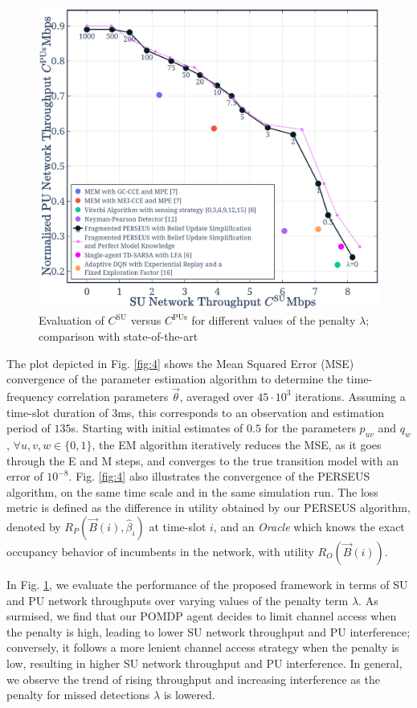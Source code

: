 \documentclass[10pt,twocolumn]{IEEEtran}
\begin{document}
\begin{figure}[t]
    \centering
    \includegraphics[width=0.8\linewidth]{Evaluation_2.png}
    \caption{Evaluation of $C^{\text{SU}}$ versus $C^{\text{PUs}}$ for different values of the penalty $\lambda$; comparison with state-of-the-art}
    \label{fig:8}
    \vspace{-6mm}
\end{figure}

The plot depicted in Fig. \ref{fig:4} shows the Mean Squared Error (MSE) convergence of the parameter estimation algorithm to determine the time-frequency correlation parameters $\vec{\theta}$, averaged over $45{\cdot} 10^3$ iterations. Assuming a time-slot duration of $3$ms, this corresponds to an observation and estimation period of $135$s. Starting with initial estimates of $0.5$ for the parameters $p_{uv}$ and $q_{w}$, ${\forall}u,v,w{\in}\{0,1\}$, the EM algorithm iteratively reduces the MSE, as it goes through the E and M steps, and converges to the true transition model with an error of $10^{-8}$. Fig. \ref{fig:4} also illustrates the convergence of the PERSEUS algorithm, on the same time scale and in the same simulation run. The loss metric is defined as the difference in utility obtained by our PERSEUS algorithm, denoted by $R_{P}(\vec{B}(i), \hat{\beta}_{i})$ at time-slot $i$, and an \emph{Oracle} which knows the exact occupancy behavior of incumbents in the network, with utility $R_{O}(\vec{B}(i))$.

In Fig. \ref{fig:8}, we evaluate the performance of the proposed framework in terms of SU and PU network throughputs over varying values of the penalty term $\lambda$. As surmised, we find that our POMDP agent decides to limit channel access when the penalty is high, leading to lower SU network throughput and PU interference; conversely, it follows a more lenient channel access strategy when the penalty is low, resulting in higher SU network throughput and PU interference. In general, we observe the trend of rising throughput and increasing interference as the penalty for missed detections $\lambda$ is lowered.
\end{document}
